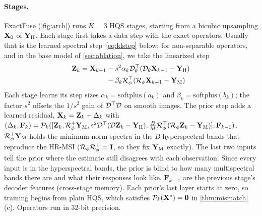 \documentclass[10pt,twocolumn,letterpaper]{article}
\begin{document}
\paragraph{Stages.} ExactFuse (\cref{fig:arch}) runs $K=3$ HQS stages, starting from a bicubic upsampling $\mathbf{X}_0$ of $\mathbf{Y}_{\mathrm{H}}$. Each stage first takes a data step with the exact operators. Usually that is the learned spectral step~\eqref{eq:klstep} below; for non-separable operators, and in the base model of \cref{sec:ablation}, we take the linearized step
\begin{equation}
\begin{split}
\mathbf{Z}_k=\mathbf{X}_{k-1}&-s^2\alpha_k\mathcal{D}_\theta^{\top}(\mathcal{D}_\theta\mathbf{X}_{k-1}-\mathbf{Y}_{\mathrm{H}})\\
&-\beta_k\mathcal{R}_\phi^{\top}(\mathcal{R}_\phi\mathbf{X}_{k-1}-\mathbf{Y}_{\mathrm{M}})
\end{split}
\label{eq:step}
\end{equation}
Each stage learns its step sizes $\alpha_k=\mathrm{softplus}(a_k)$ and $\beta_k=\mathrm{softplus}(b_k)$; the factor $s^2$ offsets the $1/s^2$ gain of $\mathcal{D}^{\top}\mathcal{D}$ on smooth images. The prior step adds a learned residual, $\mathbf{X}_k=\mathbf{Z}_k+\Delta_k$ with $(\Delta_k,\mathbf{F}_k)=\mathcal{P}_k([\mathbf{Z}_k,\mathcal{R}_\phi^{+}\mathbf{Y}_{\mathrm{M}},s^2\mathcal{D}^{\top}(\mathcal{D}\mathbf{Z}_k-\mathbf{Y}_{\mathrm{H}}),\tfrac{B}{M}\mathcal{R}_\phi^{\top}(\mathcal{R}_\phi\mathbf{Z}_k-\mathbf{Y}_{\mathrm{M}})],\mathbf{F}_{k-1})$. $\mathcal{R}_\phi^{+}\mathbf{Y}_{\mathrm{M}}$ holds the minimum-norm spectra in the $B$ hyperspectral bands that reproduce the HR-MSI ($\mathcal{R}_\phi\mathcal{R}_\phi^{+}=\mathbf{I}$, so they fix $\mathbf{Y}_{\mathrm{M}}$ exactly). The last two inputs tell the prior where the estimate still disagrees with each observation. Since every input is in the hyperspectral bands, the prior is blind to how many multispectral bands there are and what their responses look like. $\mathbf{F}_{k-1}$ are the previous stage's decoder features (cross-stage memory). Each prior's last layer starts at zero, so training begins from plain HQS, which satisfies $\mathcal{P}_k(\mathbf{X}^*)=\mathbf{0}$ in \cref{thm:mismatch}(c). Operators run in 32-bit precision.
\end{document}
